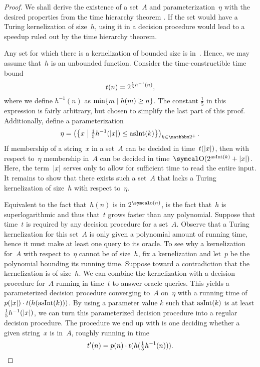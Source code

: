 \begin{proof}
  We shall derive the existence of a set~$A$ and parameterization~$\eta$ with the desired properties from the time hierarchy theorem \parencite{hartmanis1965computational,hennie1966two-tape}.
  If the set would have a Turing kernelization of size~$h$, using it in a decision procedure would lead to a speedup ruled out by the time hierarchy theorem.

  Any set for which there is a kernelization of bounded size is in~.
  Hence, we may assume that~$h$ is an unbounded function.
  Consider the time-constructible time bound
  \begin{equation*}
    t(n) = 2^{\frac{1}{5} h^{-1}(n)},
  \end{equation*}
  where we define $h^{-1}(n)$ as $\min\{m \;|\; h(m) \ge n\}$.
  The constant $\frac{1}{5}$ in this expression is fairly arbitrary, but chosen to simplify the last part of this proof.
  Additionally, define a parameterization
  \begin{equation*}
    \eta \deq \left(\left\{x \st[\middle] \tfrac{1}{5} h^{-1}(\length{x}) \le \asNat(k)\right\}\right)_{k \in \binary^+}.
  \end{equation*}
  If membership of a string~$x$ in a set~$A$ can be decided in time~$t({\lvert x\rvert})$, then with respect to~$\eta$ membership in~$A$ can be decided in time~$\bigO(2^{\asNat(k)} + \length{x})$.
  Here, the term~${\lvert x\rvert}$ serves only to allow for sufficient time to read the entire input.
  It remains to show that there exists such a set~$A$ that lacks a Turing kernelization of size~$h$ with respect to~$\eta$.

  Equivalent to the fact that~$h(n)$ is in $2^{\littleo(n)}$, is the fact that~$h$ is superlogarithmic and thus that~$t$ grows faster than any polynomial.
  Suppose that time~$t$ is required  by any decision procedure for a set~$A$.
  Observe that a Turing kernelization for this set~$A$ is only given a polynomial amount of running time, hence it must make at least one query to its oracle.
  To see why a kernelization for~$A$ with respect to~$\eta$ cannot be of size~$h$, fix a kernelization and let~$p$ be the polynomial bounding its running time.
  Suppose toward a contradiction that the kernelization is of size~$h$.
  We can combine the kernelization with a decision procedure for~$A$ running in time~$t$ to answer oracle queries.
  This yields a parameterized decision procedure converging to~$A$ on~$\eta$ with a running time of~$p({\lvert x\rvert}) \cdot t(h(\operatorname{asInt}(k)))$.
  By using a parameter value $k$ such that $\operatorname{asInt}(k)$ is at least $\frac{1}{5} h^{-1}({\lvert x\rvert})$, we can turn this parameterized decision procedure into a regular decision procedure.
  The procedure we end up with is one deciding whether a given string~$x$ is in~$A$, roughly running in time
  \begin{equation*}
    t'(n) = p(n) \cdot t(h(\tfrac{1}{5} h^{-1}(n))).
  \end{equation*}


\end{proof}
